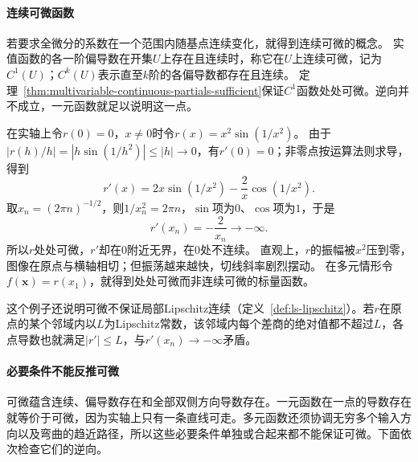 \paragraph{连续可微函数}
若要求全微分的系数在一个范围内随基点连续变化，就得到连续可微的概念。
实值函数的各一阶偏导数在开集$U$上存在且连续时，称它在$U$上连续可微，记为$C^1(U)$；$C^k(U)$表示直至$k$阶的各偏导数都存在且连续。
定理~\ref{thm:multivariable-continuous-partials-sufficient}保证$C^1$函数处处可微。逆向并不成立，一元函数就足以说明这一点。
\begin{example}[处处可微而导数无界]
\label{ex:multivariable-differentiable-not-c1}
在实轴上令$r(0)=0$，$x\neq0$时令$r(x)=x^2\sin(1/x^2)$。
由于$|r(h)/h|=|h\sin(1/h^2)|\leq|h|\to0$，有$r'(0)=0$；非零点按运算法则求导，得到
\[
 r'(x)=2x\sin(1/x^2)-\frac{2}{x}\cos(1/x^2).
\]
取$x_n=(2\pi n)^{-1/2}$，则$1/x_n^2=2\pi n$，$\sin$项为$0$、$\cos$项为$1$，于是
\[
 r'(x_n)=-\frac2{x_n}\longrightarrow-\infty.
\]
所以$r$处处可微，$r'$却在$0$附近无界，在$0$处不连续。
直观上，$r$的振幅被$x^2$压到零，图像在原点与横轴相切；但振荡越来越快，切线斜率剧烈摆动。
在多元情形令$f(\bm x)=r(x_1)$，就得到处处可微而非连续可微的标量函数。
\end{example}

这个例子还说明可微不保证局部Lipschitz连续（定义~\ref{def:ls-lipschitz}）。若$r$在原点的某个邻域内以$L$为Lipschitz常数，该邻域内每个差商的绝对值都不超过$L$，各点导数也就满足$|r'|\leq L$，与$r'(x_n)\to-\infty$矛盾。

\paragraph{必要条件不能反推可微}
可微蕴含连续、偏导数存在和全部双侧方向导数存在。一元函数在一点的导数存在就等价于可微，因为实轴上只有一条直线可走。多元函数还须协调无穷多个输入方向以及弯曲的趋近路径，所以这些必要条件单独或合起来都不能保证可微。下面依次检查它们的逆向。

